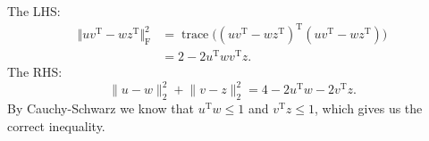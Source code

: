 \documentclass[11pt]{article}
\newcommand{\nm}[1]{\lVert #1 \rVert}
\newcommand{\trp}{\mathrm T}
\newcommand{\trace}{\operatorname{trace}}
\theoremstyle{plain}
\theoremstyle{definition}
\theoremstyle{remark}
\theoremstyle{definition}
\newenvironment{mansol}[1]{%
  \renewcommand\themansolinner{#1}%
  \mansolinner
}{\endmansolinner}
\begin{document}
\begin{mansol}{7.3.2}The LHS: \begin{align*}
    \bigl\Vert uv^\trp - w z^\trp\bigr\Vert ^2_\mathrm{F} & = \trace \bigl((uv^\trp -wz^\trp)^\trp (uv^\trp -wz^\trp)\bigr)\\
    & = 2 - 2 u^\trp w v^\trp z.
\end{align*}
The RHS: \[
    \nm{u-w}_2^2 + \nm{v-z}_2^2 = 4 - 2u^\trp w - 2v^\trp z.
\]
By Cauchy-Schwarz we know that $u^\trp w\leq 1$ and $v^\trp z \leq 1$, which gives us the correct inequality.
    
\end{mansol}

\begin{mansol}{}
    
\end{mansol}
\end{document}
